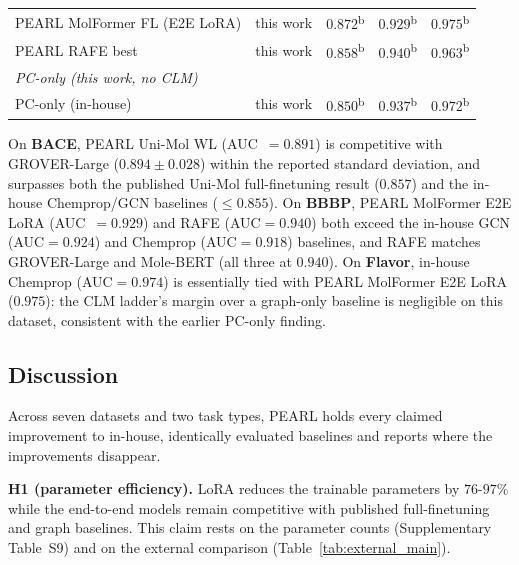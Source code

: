 \documentclass[pdflatex,sn-mathphys-num,Numbered]{sn-jnl}%
\begin{document}
\begin{table}[!ht]
{\begin{tabular}{llccc}
PEARL MolFormer FL (E2E LoRA) & this work & $0.872$\textsuperscript{b}          & $0.929$\textsuperscript{b} & $\mathbf{0.975}$\textsuperscript{b} \\
PEARL RAFE best               & this work & $0.858$\textsuperscript{b}          & $\mathbf{0.940}$\textsuperscript{b}          & $0.963$\textsuperscript{b} \\
\midrule
\multicolumn{5}{l}{\textit{PC-only (this work, no CLM)}} \\[2pt]
PC-only (in-house)     & this work & $0.850$\textsuperscript{b}          & $0.937$\textsuperscript{b}          & $0.972$\textsuperscript{b} \\
\bottomrule
\end{tabular}
}
\end{table}

On \textbf{BACE}, PEARL Uni-Mol WL (AUC~$=0.891$) is competitive with GROVER-Large ($0.894\pm0.028$) within the reported standard deviation, and surpasses both the published Uni-Mol full-finetuning result ($0.857$) and the in-house Chemprop/GCN baselines ($\le0.855$). On \textbf{BBBP}, PEARL MolFormer E2E LoRA (AUC~$=0.929$) and RAFE (AUC$=0.940$) both exceed the in-house GCN (AUC$=0.924$) and Chemprop (AUC$=0.918$) baselines, and RAFE matches GROVER-Large and Mole-BERT (all three at $0.940$). On \textbf{Flavor}, in-house Chemprop (AUC$=0.974$) is essentially tied with PEARL MolFormer E2E LoRA ($0.975$): the CLM ladder's margin over a graph-only baseline is negligible on this dataset, consistent with the earlier PC-only finding.

\FloatBarrier
\subsection{Discussion}\label{sec:bace_discussion}
Across seven datasets and two task types, PEARL holds every claimed improvement to in-house, identically evaluated baselines and reports where the improvements disappear.

\textbf{H1 (parameter efficiency).} LoRA reduces the trainable parameters by $76$-$97\%$ while the end-to-end models remain competitive with published full-finetuning and graph baselines. This claim rests on the parameter counts (Supplementary Table~S9) and on the external comparison (Table~\ref{tab:external_main}).
\end{document}
